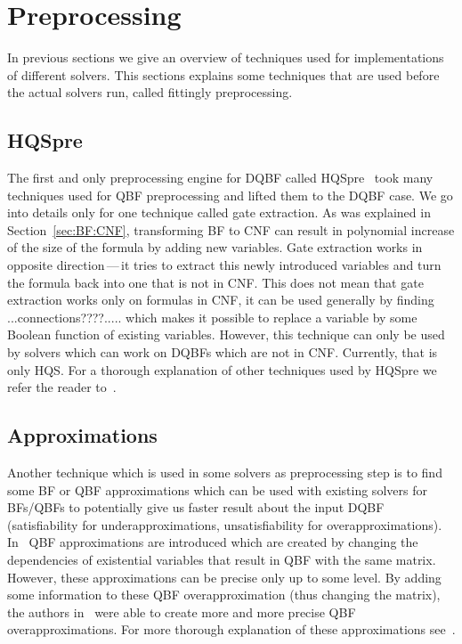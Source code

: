 \documentclass[
  digital, %
  twoside, %
  table,   %
  nolof,     %
  nolot,     %
]{fithesis3}
\theoremstyle{definition}
\theoremstyle{remark}
\begin{document}
\section{Preprocessing}
\label{sec:preprocessing}
In previous sections we give an overview of techniques used for implementations of different solvers. This sections explains some techniques that are used before the actual solvers run, called fittingly preprocessing.



\subsection{HQSpre}
The first and only preprocessing engine for DQBF called HQSpre~\cite{HQSpre1,HQSpre2,HQSpreJournal} took many techniques used for QBF preprocessing and lifted them to the DQBF case. We go into details only for one technique called gate extraction. As was explained in Section~\ref{sec:BF:CNF}, transforming BF to CNF can result in polynomial increase of the size of the formula by adding new variables. Gate extraction works in opposite direction\,---\,it tries to extract this newly introduced variables and turn the formula back into one that is not in CNF. This does not mean that gate extraction works only on formulas in CNF, it can be used generally by finding ...connections????..... which makes it possible to replace a variable by some Boolean function of existing variables. However, this technique can only be used by solvers which can work on DQBFs which are not in CNF. Currently, that is only HQS. For a thorough explanation of other techniques used by HQSpre we refer the reader to~\cite{HQSpreJournal}. 

\subsection{Approximations}
Another technique which is used in some solvers as preprocessing step is to find some BF or QBF approximations which can be used with existing solvers for BFs/QBFs to potentially give us faster result about the input DQBF (satisfiability for underapproximations, unsatisfiability for overapproximations). In~\cite{HQSsimpleAlg} QBF approximations are introduced which are created by changing the dependencies of existential variables that result in QBF with the same matrix. However, these approximations can be precise only up to some level. By adding some information to these QBF overapproximation (thus changing the matrix), the authors in~\cite{FastDQBFRefutation} were able to create more and more precise QBF overapproximations. For more thorough explanation of these approximations see~\cite[Section~3]{HQSpreJournal}.
\end{document}
